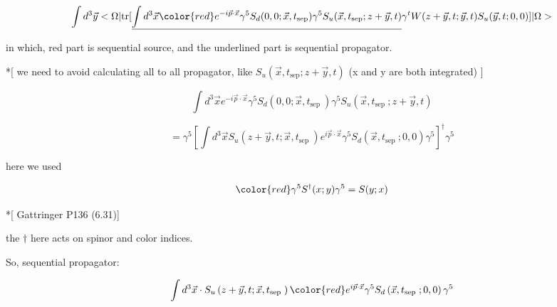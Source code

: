 \documentclass[11pt]{article} %
\begin{document}
\[ \int d^3 \vec{y} <\Omega| \text{tr}[  \underline{  \int d^{3} \vec{x} {\color{red} e^{-i \vec{p} \cdot \vec{x}} \gamma^{5}  S_d(0,0;\vec{x},t_{\text{sep}}) \gamma^{5} } S_u(\vec{x},t_{\text{sep}};z+\vec{y},t) }  \gamma^{t} W(z+\vec{y}, t ; \vec{y}, t) S_u(\vec{y},t;0,0)  ] |\Omega> \]

in which, red part is sequential source, and the underlined part is sequential propagator.

*[ we need to avoid calculating all to all propagator, like $S_u(\vec{x},t_{\text{sep}};z+\vec{y},t)$ (x and y are both integrated) ]

\[ \int d^{3} \vec{x} e^{-i \vec{p} \cdot \vec{x}} \gamma^{5} S_{d}\left(0,0 ; \vec{x}, t_{\text {sep }}\right) \gamma^{5} S_{u}\left(\vec{x}, t_{\text {sep }} ; z+\vec{y}, t\right) \]

\[ = \gamma^5 [\int d^{3} \vec{x} S_{u}\left(z+\vec{y}, t; \vec{x}, t_{\text {sep }} \right) e^{i \vec{p} \cdot \vec{x}} \gamma^{5} S_{d}\left(\vec{x}, t_{\text {sep }}; 0,0 \right) \gamma^{5} ]^{\dagger} \gamma^5 \]

here we used 

\[ {\color{red} \gamma^5 S^{\dagger}(x;y) \gamma^5 = S(y;x) } \]

*[ Gattringer P136 (6.31)]

the $\dagger$ here acts on spinor and color indices.

So, sequential propagator:

\[ \int d^{3} \vec{x} \cdot S_{u}\left(z+\vec{y}, t; \vec{x}, t_{\text {sep }} \right) {\color{red} e^{i \vec{p} \cdot \vec{x}} \gamma^{5} S_{d}\left(\vec{x}, t_{\text {sep }}; 0,0 \right) \gamma^{5} } \]
\end{document}

